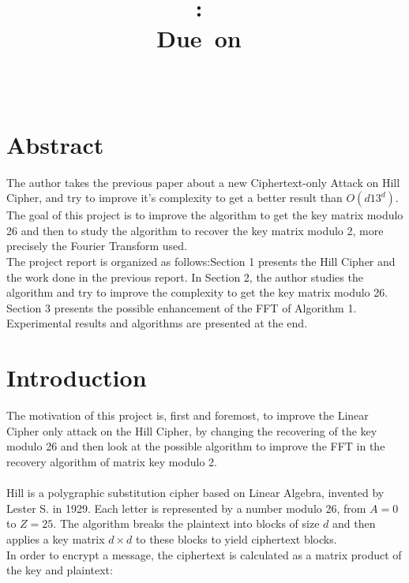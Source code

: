\documentclass{article}
\title{
\logoepfl
\vspace{2in}
\textmd{\textbf{\hmwkClass:\ \hmwkTitle}}\\
\normalsize\vspace{0.1in}\small{Due\ on\ \hmwkDueDate}\\
\vspace{0.1in}\large{\textit{\hmwkClassInstructor\ \hmwkClassTime}}
\author{\textbf{\hmwkAuthorName}}
\vspace{3in}
\logolasec
}
\begin{document}
\maketitle

\newpage
\section*{Abstract}
The author takes the previous paper about a new Ciphertext-only Attack on Hill Cipher, and try to improve it's complexity to get a better result than $O(d13^d)$.\\
${}$\hspace{1em}The goal of this project is to improve the algorithm to get the key matrix modulo 26 and then to study the algorithm to recover the key matrix modulo 2, more precisely the Fourier Transform used.\\
${}$\hspace{1em}The project report is organized as follows:Section 1 presents the Hill Cipher and the work done in the previous report. In Section 2, the author studies the algorithm and try to improve the complexity to get the key matrix modulo 26. Section 3 presents the possible enhancement of the FFT of Algorithm 1. Experimental results and algorithms are presented at the end.

\newpage
\tableofcontents
\newpage



\section{Introduction}
The motivation of this project is, first and foremost, to improve the Linear Cipher only attack on the Hill Cipher, by changing the recovering of the key modulo 26 and then look at the possible algorithm to improve the FFT in the recovery algorithm of matrix key modulo 2.\\
\\
Hill is a polygraphic substitution cipher based on Linear Algebra, invented by Lester S. in 1929. Each letter is represented by a number modulo 26, from $A=0$ to $Z=25$. The algorithm breaks the plaintext into blocks of size $d$ and then applies a key matrix $d \times d $ to these blocks to yield ciphertext blocks.\\
In order to encrypt a message, the ciphertext is calculated as a matrix product of the key and plaintext:
\end{document}
